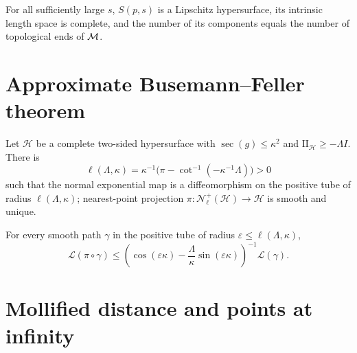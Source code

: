 \begin{proposition}
\label{prop:chow-iii-i41-large-distance-spheres}

For all sufficiently large $s$, $S(p,s)$ is a Lipschitz hypersurface, its
intrinsic length space is complete, and the number of its components equals the
number of topological ends of $\mathcal M$.
\end{proposition}

\section{Approximate Busemann--Feller theorem}

\begin{lemma}
\label{lem:chow-iii-i42-tubular-projection}
Let $\mathcal H$ be a complete two-sided hypersurface with
$\sec(g)\le\kappa^2$ and $\mathrm{II}_{\mathcal H}\ge-\Lambda I$.  There is
\[
\ell(\Lambda,\kappa)=\kappa^{-1}\bigl(\pi-\cot^{-1}(-\kappa^{-1}\Lambda)\bigr)>0
\]
such that the normal exponential map is a diffeomorphism on the positive
tube of radius $\ell(\Lambda,\kappa)$; nearest-point projection
$\pi:\mathcal N^+_{\ell}(\mathcal H)\to\mathcal H$ is smooth and unique.
\end{lemma}

\begin{theorem}
\label{thm:chow-iii-i44-approximate-busemann-feller}

For every smooth path $\gamma$ in the positive tube of radius
$\varepsilon\le\ell(\Lambda,\kappa)$,
\[
\mathcal L(\pi\circ\gamma)\le
\left(\cos(\varepsilon\kappa)-\frac\Lambda\kappa\sin(\varepsilon\kappa)\right)^{-1}
\mathcal L(\gamma).
\]
\end{theorem}

\section{Mollified distance and points at infinity}


